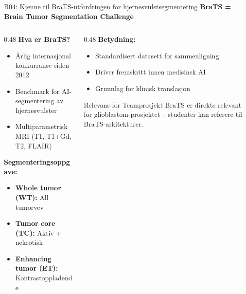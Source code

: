 \documentclass[aspectratio=169, 10pt]{beamer}
\begin{document}
\begin{frame}{B04: Kjenne til BraTS-utfordringen for hjernesvulstsegmentering}
    \textbf{\href{https://www.synapse.org/brats}{BraTS} = Brain Tumor Segmentation Challenge}

    \vspace{0.2cm}
    \begin{columns}[T]
        \begin{column}{0.48\textwidth}
            \textbf{Hva er BraTS?}
            \begin{itemize}
                \item Årlig internasjonal konkurranse siden 2012
                \item Benchmark for AI-segmentering av hjernesvulster
                \item Multiparametrisk MRI (T1, T1+Gd, T2, FLAIR)
            \end{itemize}

            \vspace{0.2cm}
            \textbf{Segmenteringsoppgave:}
            \begin{itemize}
                \item \textbf{Whole tumor (WT):} All tumorvev
                \item \textbf{Tumor core (TC):} Aktiv + nekrotisk
                \item \textbf{Enhancing tumor (ET):} Kontrastoppladende
            \end{itemize}
        \end{column}
        \begin{column}{0.48\textwidth}
            \textbf{Betydning:}
            \begin{itemize}
                \item Standardisert datasett for sammenligning
                \item Driver fremskritt innen medisinsk AI
                \item Grunnlag for klinisk translasjon
            \end{itemize}

            \vspace{0.2cm}
            \begin{block}{\footnotesize Relevans for Teamprosjekt}
                \footnotesize
                BraTS er direkte relevant for glioblastom-prosjektet -- studenter kan referere til BraTS-arkitekturer.
            \end{block}
        \end{column}
    \end{columns}
\end{frame}
\end{document}
